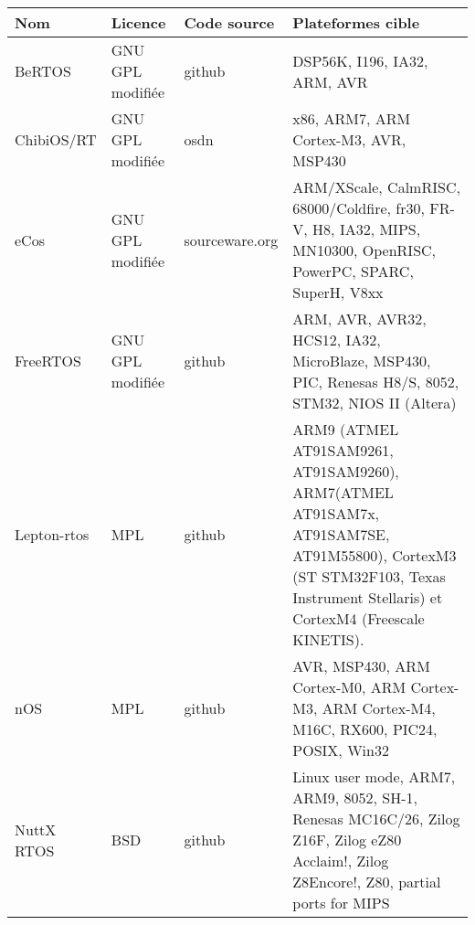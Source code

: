 \begin{tabular}{lllp{5.5cm}}
\toprule
	Nom				&	Licence				&	Code source		& 	Plateformes
																	cible		\\
\midrule
	BeRTOS			&	GNU GPL modifiée	&	github			&	{\footnotesize
																	DSP56K, I196,
																	IA32, ARM,
																	AVR		}	\\
\hline
	ChibiOS/RT		&	GNU GPL modifiée	&	osdn			&	{\footnotesize
																	x86, ARM7,
																	ARM Cortex-M3,
																	AVR, MSP430}\\
\hline
	eCos			&	GNU GPL modifiée	&	sourceware.org	&	{\footnotesize
																	ARM/XScale,
																	CalmRISC,
																	68000/Coldfire,
																	fr30, FR-V,
																	H8, IA32,
																	MIPS,
																	MN10300,
																	OpenRISC,
																	PowerPC,
																	SPARC,
																	SuperH,
																	V8xx	}	\\
\hline
	FreeRTOS		&	GNU GPL modifiée	&	github			&	{\footnotesize
																	ARM, AVR,
																	AVR32, HCS12,
																	IA32,
																	MicroBlaze,
																	MSP430, PIC,
																	Renesas H8/S,
																	8052, STM32,
																	NIOS II
																	(Altera)}	\\
\hline
	Lepton-rtos		&	MPL					&	github			&	{\footnotesize
																	ARM9 (ATMEL
																	AT91SAM9261,
																	AT91SAM9260),
																	ARM7(ATMEL
																	AT91SAM7x,
																	AT91SAM7SE,
																	AT91M55800),
																	CortexM3 (ST
																	STM32F103,
																	Texas
																	Instrument
																	Stellaris) et
																	CortexM4
																	(Freescale
																	KINETIS).} 	\\
\hline
	nOS				&	MPL					&	github			&	{\footnotesize
																	AVR, MSP430,
																	ARM Cortex-M0,
																	ARM Cortex-M3,
																	ARM Cortex-M4,
																	M16C, RX600,
																	PIC24, POSIX,
																	Win32	}	\\
\hline
	NuttX RTOS		&	BSD					&	github			&	{\footnotesize
																	Linux user mode,
																	ARM7, ARM9, 8052,
																	SH-1,
																	Renesas MC16C/26,
																	Zilog Z16F, Zilog
																	eZ80 Acclaim!,
																	Zilog Z8Encore!,
																	Z80, partial
																	ports for
																	MIPS 	}	\\

\end{tabular}
